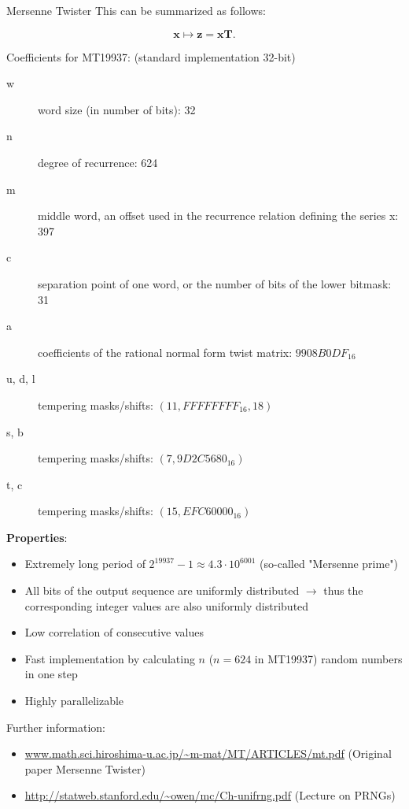 \documentclass[11pt,compress,t,notes=noshow, xcolor=table]{beamer}
\begin{document}
\begin{vbframe}{Mersenne Twister}
This can be summarized as follows:

$$\mathbf{x} \mapsto \mathbf{z} = \mathbf{x}\mathbf{T}. $$


\framebreak

Coefficients for MT19937: (standard implementation 32-bit)

\begin{description}
  \item[w] word size (in number of bits): 32
  \item[n] degree of recurrence: 624
  \item[m] middle word, an offset used in the recurrence relation defining the series x: 397
  \item[c] separation point of one word, or the number of bits of the lower bitmask: 31
  \item[a] coefficients of the rational normal form twist matrix: $9908B0DF_{16}$
  \item[u, d, l] tempering masks/shifts: $(11, FFFFFFFF_{16}, 18)$
  \item[s, b] tempering masks/shifts: $(7, 9D2C5680_{16})$
  \item[t, c] tempering masks/shifts:  $(15, EFC60000_{16})$
\end{description}

\framebreak


\textbf{Properties}:

\begin{itemize}
	\item Extremely long period of $2^{19937} - 1\approx 4.3 \cdot 10^{6001}$ (so-called "Mersenne prime")
	\item All bits of the output sequence are uniformly distributed $\to$ thus the corresponding integer values are also uniformly distributed
	\item Low correlation of consecutive values
	\item Fast implementation by calculating $n$ ($n = 624$ in MT19937) random numbers in one step
	\item Highly parallelizable
\end{itemize}

\lz

\footnotesize{
Further information:
\begin{itemize}
	\item \url{www.math.sci.hiroshima-u.ac.jp/~m-mat/MT/ARTICLES/mt.pdf} (Original paper Mersenne Twister)
	\item \url{http://statweb.stanford.edu/~owen/mc/Ch-unifrng.pdf} (Lecture on PRNGs)
\end{itemize}
}

\end{vbframe}
\end{document}
